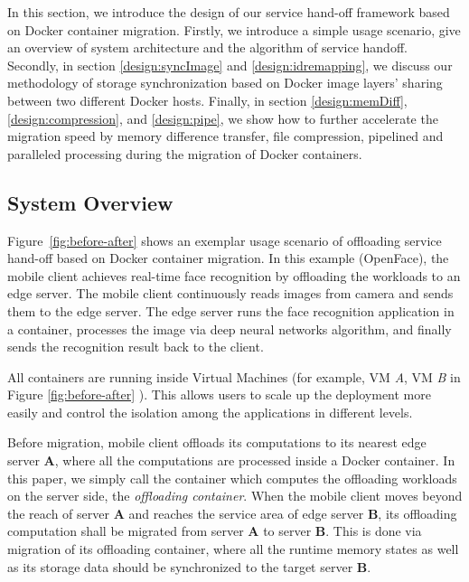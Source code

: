 



In this section, we introduce the design of our service hand-off framework based on Docker container migration. Firstly, we introduce a simple usage scenario, give an overview of system architecture and the algorithm of service handoff. Secondly, in section \ref{design:syncImage} and \ref{design:idremapping}, we discuss our methodology of storage synchronization based on Docker image layers' sharing between two different Docker hosts. Finally, in section \ref{design:memDiff}, \ref{design:compression}, and \ref{design:pipe}, we show how to further accelerate the migration speed by memory difference transfer, file compression, pipelined and paralleled processing during the migration of Docker containers.

\subsection{System Overview}

Figure~\ref{fig:before-after} shows an exemplar usage scenario of offloading service hand-off based on Docker container migration. 
In this example (OpenFace\cite{openface2016}), the mobile client achieves real-time face recognition by offloading the workloads to an edge server. 
The mobile client continuously reads images from camera and sends them to the edge server. 
The edge server runs the face recognition application in a container, processes the image via deep neural networks algorithm, and finally sends the recognition result  back to the client. 

All containers are running inside Virtual Machines (for example, VM \textit{A}, VM \textit{B} in Figure \ref{fig:before-after} ). This allows users to scale up the deployment more easily and control the isolation among the applications in different levels.


Before migration, mobile client offloads its computations to its nearest edge server \textbf{A}, where all the computations are processed inside a Docker container. 
In this paper, we simply call the container which computes the offloading workloads on the server side, the \textit{offloading container}.
When the mobile client moves beyond the reach of server \textbf{A} and reaches the service area of edge server \textbf{B}, its offloading computation shall be migrated from server \textbf{A} to server \textbf{B}. This is done via migration of its offloading container, where all the runtime memory states as well as its storage data should be synchronized to the target server \textbf{B}.

